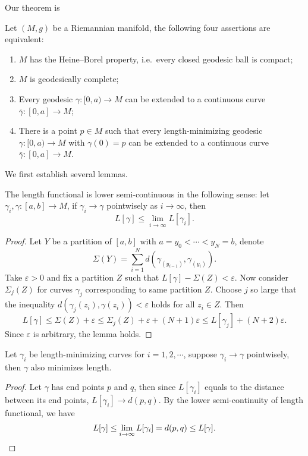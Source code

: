 Our theorem is
\begin{thm}\label{Hopf-Rinow}
    Let $(M,g)$ be a Riemannian manifold, the following four assertions are equivalent:
    \begin{enumerate}[(1)]
        \item $M$ has the Heine--Borel property, i.e.\ every closed geodesic ball is compact;
        \item $M$ is geodesically complete;
        \item Every geodesic $\gamma:[0,a)\to M$ can be extended to a continuous curve $\overline{\gamma}:[0,a]\to M$;
        \item There is a point $p\in M$ such that every length-minimizing geodesic $\gamma:[0,a)\to M$ with $\gamma(0)=p$ can be extended to a continuous curve $\overline{\gamma}:[0,a]\to M$.
    \end{enumerate}
\end{thm}

We first establish several lemmas.

\begin{lem}
    The length functional is lower semi-continuous in the following sense:
    let $\gamma_i,\gamma:[a,b]\to M$, if $\gamma_i\to\gamma$ pointwisely as $i\to\infty$, then
    \[L[\gamma]\leq\lim_{i\to\infty}L[\gamma_i].\]
\end{lem}
\begin{proof}
    Let $Y$ be a partition of $[a,b]$ with $a=y_0<\cdots<y_N=b$, denote
    \[\Sigma(Y)=\sum_{i=1}^Nd(\gamma_(y_{i-1}),\gamma_(y_i)).\]
    Take $\varepsilon>0$ and fix a partition $Z$ such that $L[\gamma]-\Sigma(Z)<\varepsilon$.
    Now consider $\Sigma_j(Z)$ for curves $\gamma_j$ corresponding to same partition $Z$.
    Choose $j$ so large that the inequality $d(\gamma_j(z_i),\gamma(z_i))<\varepsilon$ holds for all $z_i\in Z$.
    Then
    \[L[\gamma]\leq\Sigma(Z)+\varepsilon\leq\Sigma_j(Z)+\varepsilon+(N+1)\varepsilon\leq L[\gamma_j]+(N+2)\varepsilon.\]
    Since $\varepsilon$ is arbitrary, the lemma holds.
\end{proof}

\begin{lem}\label{shortest path}
    Let $\gamma_i$ be length-minimizing curves for $i=1,2,\cdots$, suppose $\gamma_i\to\gamma$ pointwisely, then $\gamma$ also minimizes length.
\end{lem}
\begin{proof}
    Let $\gamma$ has end points $p$ and $q$, then since $L[\gamma_i]$ equals to the distance between its end points, $L[\gamma_i]\to d(p,q)$.
    By the lower semi-continuity of length functional, we have
    \[L[\gamma]\leq\lim_{i\to\infty}L[\gamma_i]=d(p,q)\leq L[\gamma].\qedhere\]
\end{proof}

